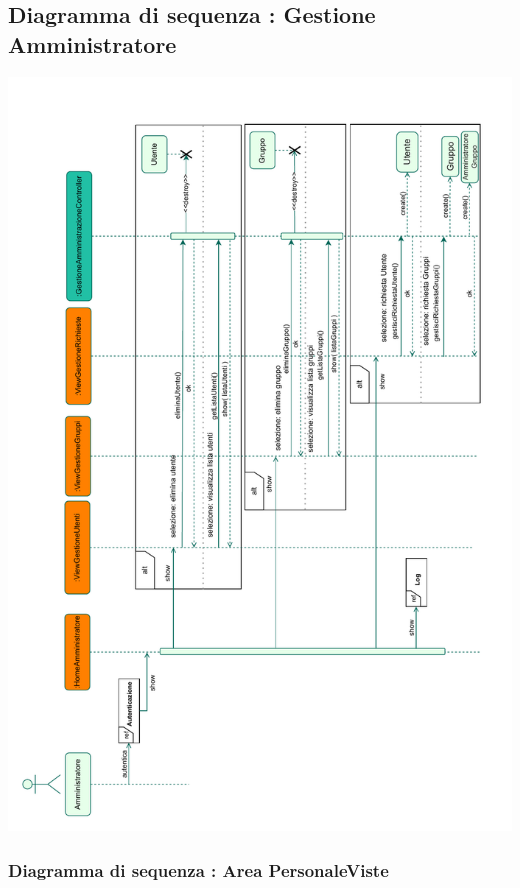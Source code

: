 \subsection*{Diagramma di sequenza : Gestione Amministratore}


\begin{adjustwidth}{-2cm}{0cm}
\includegraphics[scale=0.85]{interazione/Package-Interazione-GestioneAmministratore.drawio.pdf}
\end{adjustwidth}

\subsubsection*{Diagramma di sequenza : Area Personale\-Viste}
\vspace{0.5cm}

